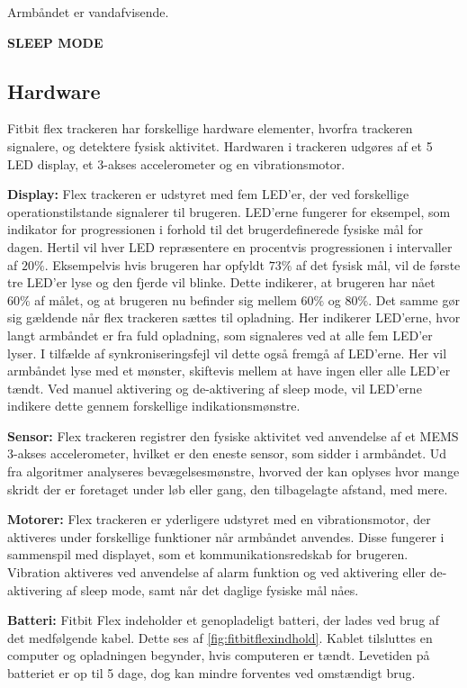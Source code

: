 Armbåndet er vandafvisende.

\textbf{SLEEP MODE}


\subsection{Hardware}
Fitbit flex trackeren har forskellige hardware elementer, hvorfra trackeren signalere, og detektere fysisk aktivitet. Hardwaren i trackeren udgøres af et 5 LED display, et 3-akses accelerometer og en vibrationsmotor.
 
\textbf{Display:} 
Flex trackeren er udstyret med fem LED'er, der ved forskellige operationstilstande signalerer til brugeren. 
LED'erne fungerer for eksempel, som indikator for progressionen i forhold til det brugerdefinerede fysiske mål for dagen. Hertil vil hver LED repræsentere en procentvis progressionen i intervaller af $20 \%$. Eksempelvis hvis brugeren har opfyldt $73 \%$ af det fysisk mål, vil de første tre LED'er lyse og den fjerde vil blinke. Dette indikerer, at brugeren har nået $60 \%$ af målet, og at brugeren nu befinder sig mellem $60 \%$ og $80 \%$. 
Det samme gør sig gældende når flex trackeren sættes til opladning. Her indikerer LED'erne, hvor langt armbåndet er fra fuld opladning, som signaleres ved at alle fem LED'er lyser. 
I tilfælde af synkroniseringsfejl vil dette også fremgå af LED'erne. Her vil armbåndet lyse med et mønster, skiftevis mellem at have ingen eller alle LED'er tændt. 
Ved manuel aktivering og de-aktivering af sleep mode, vil LED'erne indikere dette gennem forskellige indikationsmønstre.

\textbf{Sensor:} 
Flex trackeren registrer den fysiske aktivitet ved anvendelse af et MEMS 3-akses accelerometer, hvilket er den eneste sensor, som sidder i armbåndet. Ud fra algoritmer analyseres bevægelsesmønstre, hvorved der kan oplyses hvor mange skridt der er foretaget under løb eller gang, den tilbagelagte afstand, med mere. 

\textbf{Motorer:}
Flex trackeren er yderligere udstyret med en vibrationsmotor, der aktiveres under forskellige funktioner når armbåndet anvendes. Disse fungerer i sammenspil med displayet, som et kommunikationsredskab for brugeren. Vibration aktiveres ved anvendelse af alarm funktion og ved aktivering eller de-aktivering af sleep mode, samt når det daglige fysiske mål nåes. 
 
\textbf{Batteri:} 
Fitbit Flex indeholder et genopladeligt batteri, der lades ved brug af det medfølgende kabel. Dette ses af \autoref{fig:fitbitflexindhold}. Kablet tilsluttes en computer og opladningen begynder, hvis computeren er tændt. 
Levetiden på batteriet er op til 5 dage, dog kan mindre forventes ved omstændigt brug.


